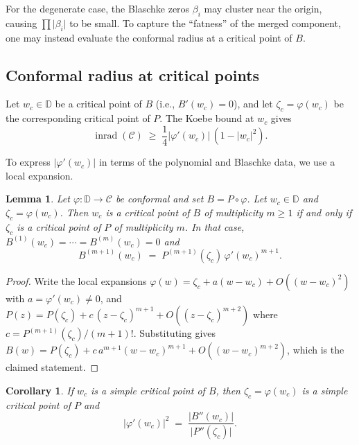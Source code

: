 \documentclass[11pt,a4paper]{amsart}
\newtheorem{lemma}[theorem]{Lemma}
\newtheorem{corollary}[theorem]{Corollary}
\theoremstyle{definition}
\newcommand{\D}{\mathbb{D}}
\newcommand{\abs}[1]{\lvert #1 \rvert}
\newcommand{\inrad}{\operatorname{inrad}}
\begin{document}
For the degenerate case, the Blaschke zeros $\beta_i$ may cluster
near the origin, causing $\prod\abs{\beta_i}$ to be small.
To capture the ``fatness'' of the merged component, one may instead
evaluate the conformal radius at a critical point of $B$.

\subsection{Conformal radius at critical points}

Let $w_c \in \D$ be a critical point of $B$ (i.e., $B'(w_c) = 0$),
and let $\zeta_c = \varphi(w_c)$ be the corresponding critical point
of $P$.  The Koebe bound at $w_c$ gives
\begin{equation}\label{eq:crit-koebe}
  \inrad(\mathcal{C}) \;\geq\;
  \frac{1}{4}\abs{\varphi'(w_c)}\,(1 - \abs{w_c}^2).
\end{equation}

To express $\abs{\varphi'(w_c)}$ in terms of the polynomial and Blaschke
data, we use a local expansion.

\begin{lemma}\label{lem:local-multiplicity}
Let $\varphi \colon \D \to \mathcal{C}$ be conformal and set
$B = P \circ \varphi$.  Let $w_c \in \D$ and $\zeta_c = \varphi(w_c)$.
Then $w_c$ is a critical point of $B$ of multiplicity $m \geq 1$
if and only if $\zeta_c$ is a critical point of $P$ of multiplicity $m$.
In that case,
$B^{(1)}(w_c) = \cdots = B^{(m)}(w_c) = 0$ and
\begin{equation}\label{eq:faa-di-bruno}
  B^{(m+1)}(w_c) \;=\; P^{(m+1)}(\zeta_c)\,\varphi'(w_c)^{m+1}.
\end{equation}
\end{lemma}

\begin{proof}
Write the local expansions
$\varphi(w) = \zeta_c + a(w - w_c) + O((w - w_c)^2)$ with
$a = \varphi'(w_c) \neq 0$, and
$P(z) = P(\zeta_c) + c\,(z - \zeta_c)^{m+1} + O((z - \zeta_c)^{m+2})$
where $c = P^{(m+1)}(\zeta_c)/(m+1)!$.
Substituting gives
$B(w) = P(\zeta_c) + c\,a^{m+1}(w - w_c)^{m+1} + O((w - w_c)^{m+2})$,
which is the claimed statement.
\end{proof}

\begin{corollary}\label{cor:simple-critical}
If $w_c$ is a simple critical point of $B$, then $\zeta_c = \varphi(w_c)$
is a simple critical point of $P$ and
\begin{equation}\label{eq:lhopital}
  \abs{\varphi'(w_c)}^2 \;=\;
  \frac{\abs{B''(w_c)}}{\abs{P''(\zeta_c)}}.
\end{equation}
\end{corollary}
\end{document}
